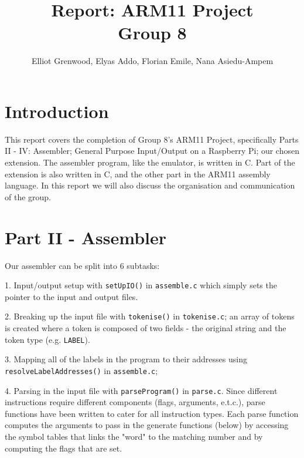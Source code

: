 \documentclass[11pt]{article}
\begin{document}
\title{Report: ARM11 Project \\ Group 8}
\author{Elliot Grenwood, Elyas Addo, Florian Emile, Nana Asiedu-Ampem}

\maketitle

\section{Introduction}
This report covers the completion of Group 8's ARM11 Project, specifically Parts II - IV: Assembler; General Purpose Input/Output on a Raspberry Pi; our chosen extension. The assembler program, like the emulator, is written in C. Part of the extension is also written in C, and the other part in the ARM11 assembly language. In this report we will also discuss the organisation and communication of the group.

\section{Part II - Assembler}

Our assembler can be split into 6 subtasks:\newline

1. Input/output setup with \verb|setUpIO()| in \texttt{assemble.c} which simply sets the pointer
to the input and output files.\newline

2. Breaking up the input file with \verb|tokenise()| in \texttt{tokenise.c}; an array of tokens is created where a token is composed of two fields - the original string and the token type (e.g. \texttt{LABEL}).\newline

3. Mapping all of the labels in the program to their addresses using \verb|resolveLabelAddresses()| in \texttt{assemble.c};\newline

4. Parsing in the input file with \verb|parseProgram()| in \texttt{parse.c}. Since different instructions require different components (flags, arguments, e.t.c.), parse functions have been written to cater for all instruction types. Each parse function computes the arguments to pass in the generate functions (below) by accessing the symbol tables that links the "word" to the matching number and by
computing the flags that are set.\newline
\end{document}

